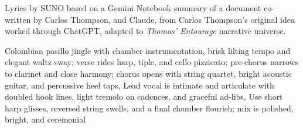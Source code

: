 
\begin{notes}
Lyrics by SUNO based on a Gemini Notebook summary of a document co-written by Carlos Thompson, and Claude, from Carlos Thompson's original idea worked through ChatGPT, adapted to \emph{Thomas’ Entourage} narrative universe.
\end{notes}
\begin{style}
Colombian pasillo jingle with chamber instrumentation, brisk lilting tempo and elegant waltz sway; verse rides harp, tiple, and cello pizzicato; pre-chorus narrows to clarinet and close harmony; chorus opens with string quartet, bright acoustic guitar, and percussive heel taps, Lead vocal is intimate and articulate with doubled hook lines, light tremolo on cadences, and graceful ad-libs, Use short harp glisses, reversed string swells, and a final chamber flourish; mix is polished, bright, and ceremonial
\end{style}
